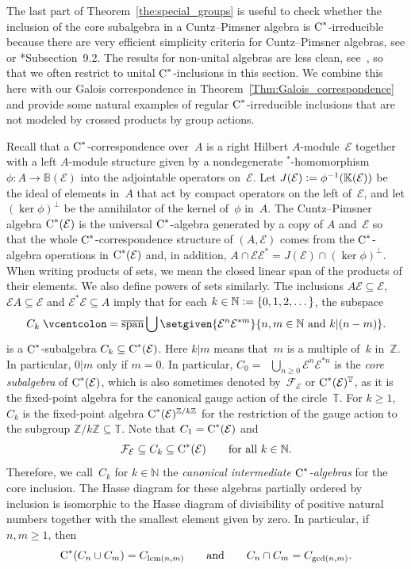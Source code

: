 \documentclass[a4paper]{amsart}
\theoremstyle{plain}
\theoremstyle{definition}
\theoremstyle{remark}
\numberwithin{theorem}{section}
\numberwithin{equation}{section}
\DeclareMathOperator*{\clsp}{\overline{span}} %
\newcommand*{\nb}{\nobreakdash}
\newcommand*{\Star}{\(^*\)\nobreakdash-}
\newcommand*{\Z}{\mathbb Z}
\newcommand*{\N}{\mathbb N}
\newcommand*{\T}{\mathbb T}%
\newcommand*{\Bound}{\mathbb B}%
\newcommand*{\Comp}{\mathbb K}%
\newcommand*{\Cst}{\textup C^*}%
\newcommand*{\Hilm}[1][E]{\mathcal #1}%
\newcommand*{\defeq}{\mathrel{\vcentcolon=}}%
\begin{document}
The last part of Theorem~\ref{the:special_groups} is useful to check
whether the inclusion of the core subalgebra in a Cuntz--Pimsner
algebra is \(\Cst\)\nb-irreducible because there are very efficient simplicity
criteria for Cuntz--Pimsner algebras, see
\cite{Schweizer:Dilations_correspondences} or
\cite{Carlsen-Kwasniewski-Ortega:Free_correspondence}*{Subsection~9.2}.
The results for non-unital algebras are less clean,
see~\cite{Paulovicks-Tomforde:CK_uniqueness}, so that we often
restrict to unital \(\Cst\)\nb-inclusions in this section.
We combine this here with our Galois correspondence in
Theorem~\ref{Thm:Galois_correspondence} and provide some natural
examples of regular \(\Cst\)\nb-irreducible inclusions that are not
modeled by  crossed products by group actions.

Recall that a \(\Cst\)\nb-correspondence over~\(A\) is a right Hilbert
\(A\)\nb-module~\(\Hilm\) together with a left \(A\)\nb-module
structure given by a nondegenerate \Star{}homomorphism \(\phi\colon
A\to \Bound(\Hilm)\) into the adjointable operators on~\(\Hilm\).
Let \(J(\Hilm) \defeq \phi^{-1}(\Comp(\Hilm))\) be the ideal of
elements in~\(A\) that act by compact operators on the left
of~\(\Hilm\), and let \((\ker\phi)^\bot\) be the annihilator of the
kernel of~\(\phi\) in~\(A\).
The Cuntz--Pimsner algebra \(\Cst(\Hilm)\) is the universal
\(\Cst\)\nb-algebra generated by a copy of \(A\) and~\(\Hilm\) so that
the whole \(\Cst\)\nb-correspondence structure  of \((A,\Hilm)\) comes
from the \(\Cst\)\nb-algebra operations in \(\Cst(\Hilm)\) and, in
addition, \(A\cap \Hilm\Hilm^* =J(\Hilm)\cap(\ker\phi)^\bot\).
When writing products of sets, we mean the closed linear span of
the products of their elements.
We also define powers of sets similarly.
The inclusions \(A\Hilm\subseteq \Hilm\), \(\Hilm A\subseteq \Hilm\)
and \(\Hilm^*\Hilm\subseteq A\) imply that for each \(k\in \N\defeq\{0,1,2,\dots\}\), the
subspace
\[
  C_k\defeq \clsp\bigcup\setgiven{\Hilm^n\Hilm^{* m}}
  {n,m \in \N  \text{ and }k|(n-m) }.
\]
is a \(\Cst\)\nb-subalgebra \(C_k\subseteq \Cst(\Hilm)\).
Here \(k|m\) means that~\(m\) is a multiple of~\(k\) in~\(\Z\).
In particular, \(0|m\) only if \(m=0\).
In particular, \(C_0=\clsp\bigcup_{n\ge 0}\Hilm^n \Hilm^{*n}\) is the
\emph{core subalgebra} of \(\Cst(\Hilm)\), which is also sometimes
denoted by~\(\Hilm[F]_{\Hilm}\) or \(\Cst(\Hilm)^\T\), as it is the
fixed-point algebra for the canonical gauge action of the
circle~\(\T\).
For \(k\geq 1\),~\(C_k\) is the fixed-point
algebra \(\Cst(\Hilm)^{\Z/k\Z}\) for the restriction of the gauge
action to the subgroup \(\Z/k\Z\subseteq \T\).
Note that \(C_1= \Cst(\Hilm)\) and
\[
  \Hilm[F]_{\Hilm}
  \subseteq C_k
  \subseteq \Cst(\Hilm)
  \qquad \text{for  all }k\in \N.
\]
Therefore, we call~\(C_k\) for \(k\in \N \) the \emph{canonical
  intermediate \(\Cst\)\nb-algebras} for the core inclusion.
The Hasse diagram for these algebras partially ordered by inclusion is
isomorphic to the Hasse diagram of divisibility of positive natural
numbers together with the smallest element given by zero.
In particular, if \(n,m\geq 1\), then
\[
  \Cst(C_n\cup C_m) = C_{\operatorname{lcm}(n,m)}
  \qquad \text{and}\qquad
  C_n\cap C_m = C_{\operatorname{gcd}(n,m)}.
\]
\end{document}
